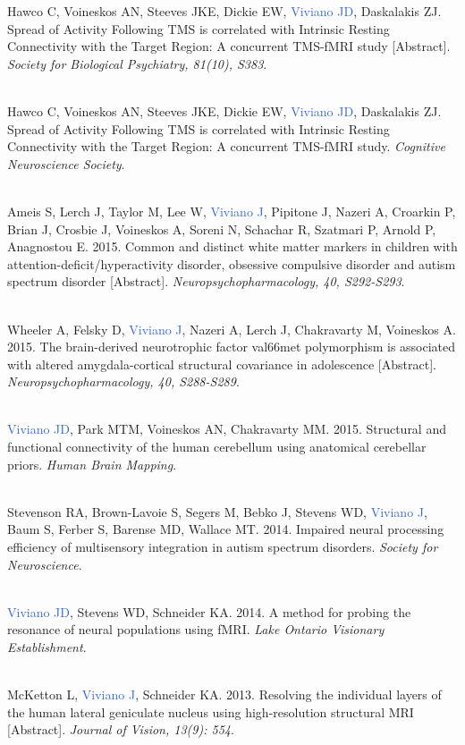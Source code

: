 \documentclass[a4paper,11pt,oneside]{book}
\begin{document}
\begin{flushleft}
Hawco C, Voineskos AN, Steeves JKE, Dickie EW, \textcolor{highlight}{Viviano JD}, Daskalakis ZJ. Spread of Activity Following TMS is correlated with Intrinsic Resting Connectivity with the Target Region: A concurrent TMS-fMRI study [Abstract]. \textit{Society for Biological Psychiatry, 81(10), S383}. \\\

Hawco C, Voineskos AN, Steeves JKE, Dickie EW, \textcolor{highlight}{Viviano JD}, Daskalakis ZJ. Spread of Activity Following TMS is correlated with Intrinsic Resting Connectivity with the Target Region: A concurrent TMS-fMRI study. \textit{Cognitive Neuroscience Society}. \\\

Ameis S, Lerch J, Taylor M, Lee W, \textcolor{highlight}{Viviano J}, Pipitone J, Nazeri A, Croarkin P, Brian J, Crosbie J, Voineskos A, Soreni N, Schachar R, Szatmari P, Arnold P, Anagnostou E. 2015. Common and distinct white matter markers in children with attention-deficit/hyperactivity disorder, obsessive compulsive disorder and autism spectrum disorder [Abstract]. \textit{Neuropsychopharmacology, 40, S292-S293}. \\\

Wheeler A, Felsky D, \textcolor{highlight}{Viviano J}, Nazeri A, Lerch J, Chakravarty M, Voineskos A. 2015. The brain-derived neurotrophic factor val66met polymorphism is associated with altered amygdala-cortical structural covariance in adolescence [Abstract]. \textit{Neuropsychopharmacology, 40, S288-S289}. \\\

\textcolor{highlight}{Viviano JD}, Park MTM, Voineskos AN, Chakravarty MM. 2015. Structural and functional connectivity of the human cerebellum using anatomical cerebellar priors. \textit{Human Brain Mapping}. \\\

Stevenson RA, Brown-Lavoie S, Segers M, Bebko J, Stevens WD, \textcolor{highlight}{Viviano J}, Baum S, Ferber S, Barense MD, Wallace MT. 2014. Impaired neural processing efficiency of multisensory integration in autism spectrum disorders. \textit{Society for Neuroscience}. \\\

\textcolor{highlight}{Viviano JD}, Stevens WD, Schneider KA. 2014. A method for probing the resonance of neural populations using fMRI. \textit{Lake Ontario Visionary Establishment}. \\\

McKetton L, \textcolor{highlight}{Viviano J}, Schneider KA. 2013. Resolving the individual layers of the human lateral geniculate nucleus using high-resolution structural MRI [Abstract]. \textit{Journal of Vision, 13(9): 554}. \\\


\end{flushleft}
\end{document}
